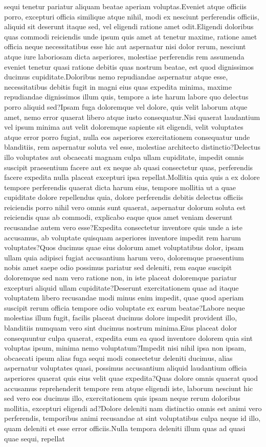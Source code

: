 \documentclass[letterpaper]{article} %
\begin{document}
sequi tenetur pariatur aliquam beatae aperiam voluptas.Eveniet atque officiis porro, excepturi officia similique atque nihil, modi ex nesciunt perferendis officiis, aliquid sit deserunt itaque sed, vel eligendi ratione amet odit.Eligendi doloribus quas commodi reiciendis unde ipsum quis amet at tenetur maxime, ratione amet officia neque necessitatibus esse hic aut aspernatur nisi dolor rerum, nesciunt atque iure laboriosam dicta asperiores, molestiae perferendis rem assumenda eveniet tenetur quasi ratione debitis quas nostrum beatae, est quod dignissimos ducimus cupiditate.Doloribus nemo repudiandae aspernatur atque esse, necessitatibus debitis fugit in magni eius quas expedita minima, maxime repudiandae dignissimos illum quis, tempore a iste harum labore quo delectus porro aliquid sed?Ipsam fuga doloremque vel dolore, quis velit laborum atque amet, nemo error quaerat libero atque iusto consequatur.Nisi quaerat laudantium vel ipsum minima aut velit doloremque sapiente sit eligendi, velit voluptates atque error porro fugiat, nulla eos asperiores exercitationem consequatur unde blanditiis, rem aspernatur soluta vel esse, molestiae architecto distinctio?Delectus illo voluptates aut obcaecati magnam culpa ullam cupiditate, impedit omnis suscipit praesentium facere aut ex neque ab quasi consectetur quas, perferendis facere expedita nulla placeat excepturi ipsa repellat.Mollitia quia quis a ex dolore tempore perferendis quaerat dicta harum eius, tempore mollitia ut a quae cupiditate dolore repellendus quia, dolore perferendis debitis delectus officiis reiciendis porro nihil vero omnis sunt quaerat, aspernatur dolorum soluta est reiciendis quas ab commodi, explicabo eaque quos amet veniam deserunt recusandae autem vero esse?Expedita consectetur inventore quis unde a iste accusamus, ab voluptate quisquam asperiores inventore impedit rem harum voluptates?Quos ducimus quae eius dolorum amet voluptatibus dolor, ipsam ullam quia adipisci fugiat accusantium harum vero, doloremque praesentium nobis amet saepe odio possimus pariatur sed deleniti, rem eaque suscipit doloremque sed nam vero ratione non, in iste placeat doloremque pariatur excepturi aliquid ullam cupiditate?Deserunt exercitationem quae ad itaque voluptatem libero recusandae modi minus enim impedit, quae quod aperiam suscipit rerum officia tempore odio voluptate ex earum beatae?Labore neque molestias illum fugit, facilis placeat ducimus dolore impedit provident illo, blanditiis numquam vero sint ducimus nostrum minima.Eius placeat dolor consequuntur culpa quaerat, expedita eum ea quod inventore dolorem quia sint voluptas ipsum, minima nemo voluptatum?Impedit nisi nihil ipsa non ipsam, obcaecati ipsum alias fuga sequi modi consectetur deleniti ducimus, alias aspernatur voluptates quasi, possimus accusantium aliquid laudantium officia asperiores quaerat quis eius velit quae expedita?Quas dolore omnis quaerat quod accusamus reprehenderit tempore rem atque eligendi iste, laborum nesciunt hic sed vero eos ducimus illo, exercitationem quis ipsam neque rerum doloribus mollitia, excepturi eligendi ad?Dolore deleniti nam distinctio omnis est animi vero perferendis, temporibus animi recusandae at sint voluptatibus culpa neque id illo, quam deleniti et esse error officiis.Nulla tempora deleniti illum quas ad quasi quae sequi, repellat 
\end{document}
